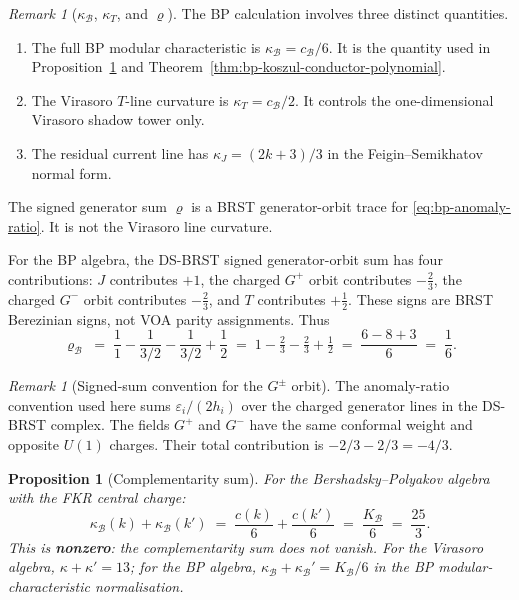 \documentclass[11pt]{article}
\theoremstyle{plain}
\newtheorem{proposition}[theorem]{Proposition}
\theoremstyle{definition}
\theoremstyle{remark}
\newtheorem{remark}[theorem]{Remark}
\newcommand{\cB}{\mathcal{B}}
\numberwithin{equation}{section}
\begin{document}
\begin{remark}[$\kappa_{\cB}$, $\kappa_T$, and $\varrho$]
\label{rem:kappa-vs-rho-disambiguation}
The BP calculation involves three distinct quantities.
\begin{enumerate}[label=(\alph*)]
 \item The full BP modular characteristic is
 $\kappa_{\cB}=c_{\cB}/6$. It is the quantity used in
 Proposition~\ref{prop:complementarity} and
 Theorem~\ref{thm:bp-koszul-conductor-polynomial}.
 \item The Virasoro $T$-line curvature is $\kappa_T=c_{\cB}/2$.
 It controls the one-dimensional Virasoro shadow tower only.
 \item The residual current line has
 $\kappa_J=(2k+3)/3$ in the Feigin--Semikhatov normal form.
\end{enumerate}
The signed generator sum $\varrho$ is a BRST generator-orbit trace for
\eqref{eq:bp-anomaly-ratio}. It is not the Virasoro line curvature.
\end{remark}

For the BP algebra, the DS-BRST signed generator-orbit sum has four
contributions: $J$ contributes $+1$, the charged $G^+$ orbit
contributes $-\tfrac{2}{3}$, the charged $G^-$ orbit contributes
$-\tfrac{2}{3}$, and $T$ contributes $+\tfrac{1}{2}$. These signs are
BRST Berezinian signs, not VOA parity assignments. Thus
\begin{equation}\label{eq:bp-anomaly-ratio}
 \varrho_{\cB}
 \;=\;
 \frac{1}{1} - \frac{1}{3/2} - \frac{1}{3/2} + \frac{1}{2}
 \;=\;
 1 - \tfrac{2}{3} - \tfrac{2}{3} + \tfrac{1}{2}
 \;=\; \frac{6 - 8 + 3}{6}
 \;=\; \frac{1}{6}.
\end{equation}

\begin{remark}[Signed-sum convention for the $G^\pm$ orbit]
\label{rem:bp-signed-sum-convention}
The anomaly-ratio convention used here sums $\varepsilon_i / (2 h_i)$
over the charged generator lines in the DS-BRST complex. The fields
$G^+$ and $G^-$ have the same conformal weight and opposite $U(1)$
charges. Their total contribution is $-2/3-2/3=-4/3$.
\end{remark}

\begin{proposition}[Complementarity sum]\label{prop:complementarity}
For the Bershadsky--Polyakov algebra with the FKR central charge:
\begin{equation}\label{eq:complementarity}
 \kappa_{\cB}(k) + \kappa_{\cB}(k')
 \;=\;
 \frac{c(k)}{6} + \frac{c(k')}{6}
 \;=\;
 \frac{K_{\cB}}{6}
 \;=\; \frac{25}{3}.
\end{equation}
This is \textbf{nonzero}: the complementarity sum does not vanish.
For the Virasoro algebra, $\kappa + \kappa' = 13$; for the BP algebra,
$\kappa_{\cB} + \kappa_{\cB}' = K_{\cB}/6$ in the BP modular-characteristic
normalisation.
\end{proposition}
\end{document}
